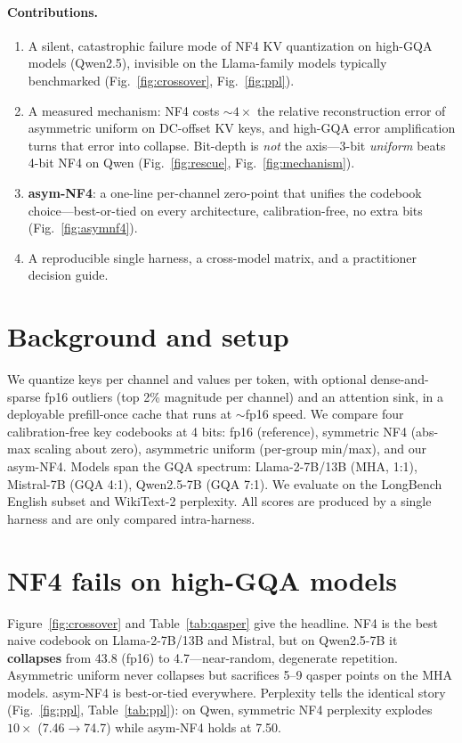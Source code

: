 \documentclass[11pt]{article}
\newcommand{\collapse}[1]{\textcolor{collapse}{\textbf{#1}}}
\begin{document}
\paragraph{Contributions.}
\begin{enumerate}
  \item A silent, catastrophic failure mode of NF4 KV quantization on high-GQA models
        (Qwen2.5), invisible on the Llama-family models typically benchmarked
        (Fig.~\ref{fig:crossover}, Fig.~\ref{fig:ppl}).
  \item A measured mechanism: NF4 costs ${\sim}4\times$ the relative reconstruction error of
        asymmetric uniform on DC-offset KV keys, and high-GQA error amplification turns that
        error into collapse. Bit-depth is \emph{not} the axis---3-bit \emph{uniform} beats
        4-bit NF4 on Qwen (Fig.~\ref{fig:rescue}, Fig.~\ref{fig:mechanism}).
  \item \textbf{asym-NF4}: a one-line per-channel zero-point that unifies the codebook
        choice---best-or-tied on every architecture, calibration-free, no extra bits
        (Fig.~\ref{fig:asymnf4}).
  \item A reproducible single harness, a cross-model matrix, and a practitioner decision guide.
\end{enumerate}

\section{Background and setup}
We quantize keys per channel and values per token, with optional dense-and-sparse fp16
outliers (top 2\% magnitude per channel) and an attention sink, in a deployable prefill-once
cache that runs at ${\sim}$fp16 speed. We compare four calibration-free key codebooks at 4 bits:
fp16 (reference), symmetric NF4 (abs-max scaling about zero), asymmetric uniform (per-group
min/max), and our asym-NF4. Models span the GQA spectrum: Llama-2-7B/13B (MHA, 1:1), Mistral-7B
(GQA 4:1), Qwen2.5-7B (GQA 7:1). We evaluate on the LongBench English subset and WikiText-2
perplexity. All scores are produced by a single harness and are only compared intra-harness.

\section{NF4 fails on high-GQA models}
\label{sec:headline}
Figure~\ref{fig:crossover} and Table~\ref{tab:qasper} give the headline. NF4 is the best naive
codebook on Llama-2-7B/13B and Mistral, but on Qwen2.5-7B it \collapse{collapses} from 43.8
(fp16) to 4.7---near-random, degenerate repetition. Asymmetric uniform never collapses but
sacrifices 5--9 qasper points on the MHA models. asym-NF4 is best-or-tied everywhere.
Perplexity tells the identical story (Fig.~\ref{fig:ppl}, Table~\ref{tab:ppl}): on Qwen,
symmetric NF4 perplexity explodes $10\times$ (7.46$\rightarrow$74.7) while asym-NF4 holds at 7.50.
\end{document}
